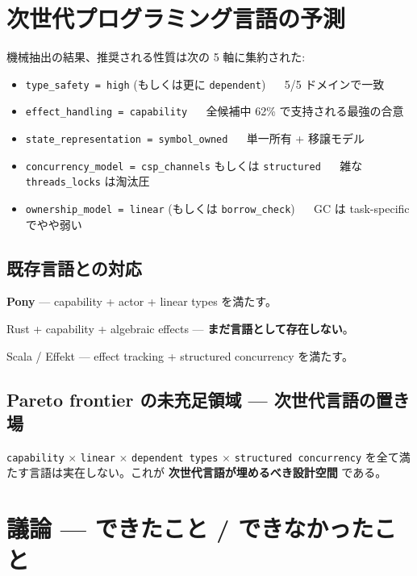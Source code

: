 \documentclass[a4paper,11pt]{article}
\begin{document}
\section{次世代プログラミング言語の予測}

機械抽出の結果、推奨される性質は次の 5 軸に集約された:

\begin{itemize}
  \item \texttt{type\_safety = high} (もしくは更に \texttt{dependent})
        \(\quad\) 5/5 ドメインで一致
  \item \texttt{effect\_handling = capability}
        \(\quad\) 全候補中 62\% で支持される最強の合意
  \item \texttt{state\_representation = symbol\_owned}
        \(\quad\) 単一所有 + 移譲モデル
  \item \texttt{concurrency\_model = csp\_channels} もしくは \texttt{structured}
        \(\quad\) 雑な \texttt{threads\_locks} は淘汰圧
  \item \texttt{ownership\_model = linear} (もしくは \texttt{borrow\_check})
        \(\quad\) GC は task-specific でやや弱い
\end{itemize}

\subsection{既存言語との対応}

\begin{description}[leftmargin=8mm]
  \item[最近傍] {\bfseries Pony} ---
    capability + actor + linear types を満たす。
  \item[次点] Rust + capability + algebraic effects ---
    {\bfseries まだ言語として存在しない}。
  \item[関数型側] Scala / Effekt ---
    effect tracking + structured concurrency を満たす。
\end{description}

\subsection{Pareto frontier の未充足領域 — 次世代言語の置き場}

\texttt{capability} \(\times\) \texttt{linear} \(\times\)
\texttt{dependent types} \(\times\) \texttt{structured concurrency}
を全て満たす言語は実在しない。これが
{\bfseries 次世代言語が埋めるべき設計空間} である。

\section{議論 — できたこと / できなかったこと}
\end{document}
